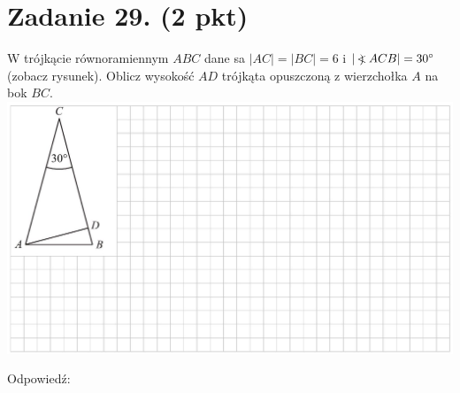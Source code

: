 \documentclass[10pt]{article}
\newcommand\Varangle{\mathop{{<\!\!\!\!\!\text{\small)}}\:}\nolimits}
\begin{document}
\section*{Zadanie 29. (2 pkt)}
W trójkącie równoramiennym \(A B C\) dane sa \(|A C|=|B C|=6\) i \(|\Varangle A C B|=30^{\circ}\) (zobacz rysunek). Oblicz wysokość \(A D\) trójkąta opuszczoną z wierzchołka \(A\) na bok \(B C\).\\
\includegraphics[max width=\textwidth, center]{2024_11_21_6a8be49478f78d0689cfg-11}

Odpowiedź:
\end{document}
